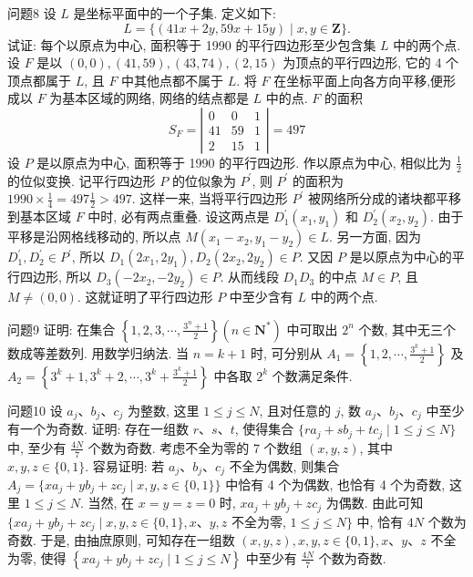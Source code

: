 问题8 设 $L$ 是坐标平面中的一个子集.
定义如下:
$$
L=\{(41 x+2 y, 59 x+15 y) \mid x, y \in \mathbf{Z}\} .
$$
试证: 每个以原点为中心, 面积等于 1990 的平行四边形至少包含集 $L$ 中的两个点.
设 $F$ 是以 $(0,0),(41,59),(43,74),(2,15)$ 为顶点的平行四边形, 它的 4 个顶点都属于 $L$, 且 $F$ 中其他点都不属于 $L$. 将 $F$ 在坐标平面上向各方向平移,便形成以 $F$ 为基本区域的网络, 网络的结点都是 $L$ 中的点.
$F$ 的面积
$$
S_F=\left|\begin{array}{ccc}
0 & 0 & 1 \\
41 & 59 & 1 \\
2 & 15 & 1
\end{array}\right|=497
$$
设 $P$ 是以原点为中心, 面积等于 1990 的平行四边形.
作以原点为中心, 相似比为 $\frac{1}{2}$ 的位似变换.
记平行四边形 $P$ 的位似象为 $P^{\prime}$, 则 $P^{\prime}$ 的面积为 $1990 \times \frac{1}{4}=497 \frac{1}{2}>497$. 这样一来, 当将平行四边形 $P^{\prime}$ 被网络所分成的诸块都平移到基本区域 $F$ 中时, 必有两点重叠.
设这两点是 $D_1^{\prime}\left(x_1, y_1\right)$ 和 $D_2^{\prime}\left(x_2, y_2\right)$. 由于平移是沿网格线移动的, 所以点 $M\left(x_1-x_2, y_1-y_2\right) \in L$.
另一方面, 因为 $D_1^{\prime}, D_2^{\prime} \in P^{\prime}$, 所以 $D_1\left(2 x_1, 2 y_1\right), D_2\left(2 x_2, 2 y_2\right) \in P$. 又因 $P$ 是以原点为中心的平行四边形, 所以 $D_3\left(-2 x_2,-2 y_2\right) \in P$. 从而线段 $D_1 D_3$ 的中点 $M \in P$, 且 $M \neq(0,0)$. 这就证明了平行四边形 $P$ 中至少含有 $L$ 中的两个点.



问题9 证明: 在集合 $\left\{1,2,3, \cdots, \frac{3^n+1}{2}\right\}\left(n \in \mathbf{N}^*\right)$ 中可取出 $2^n$ 个数, 其中无三个数成等差数列.
用数学归纳法.
当 $n=k+1$ 时, 可分别从 $A_1=\left\{1,2, \cdots, \frac{3^k+1}{2}\right\}$ 及 $A_2=\left\{3^k+1,3^k+2, \cdots, 3^k+\frac{3^k+1}{2}\right\}$ 中各取 $2^k$ 个数满足条件.



问题10 设 $a_j 、 b_j 、 c_j$ 为整数, 这里 $1 \leqslant j \leqslant N$, 且对任意的 $j$, 数 $a_j 、 b_j 、 c_j$ 中至少有一个为奇数.
证明: 存在一组数 $r 、 s 、 t$, 使得集合 $ \{r a_j+s b_j+t c_j \mid 1 \leqslant j \leqslant N\}$ 中, 至少有 $\frac{4 N}{7}$ 个数为奇数.
考虑不全为零的 7 个数组 $(x, y, z)$, 其中 $x, y, z \in\{0,1\}$. 容易证明: 若 $a_j 、 b_j 、 c_j$ 不全为偶数, 则集合 $A_j=\{x a_j+y b_j+z c_j \mid x, y, z \in\{0,1\}\}$ 中恰有 4 个为偶数, 也恰有 4 个为奇数, 这里 $1 \leqslant j \leqslant N$. 当然, 在 $x=y= z=0$ 时, $x a_j+y b_j+z c_j$ 为偶数.
由此可知 $ \{x a_j+y b_j+z c_j \mid x, y, z \in\{0,1\}, x 、 y, z$ 不全为零, $1 \leqslant j \leqslant N\}$ 中, 恰有 $4 N$ 个数为奇数.
于是, 由抽庶原则, 可知存在一组数 $(x, y, z), x, y, z \in\{0,1\}, x 、 y 、 z$ 不全为零, 使得 $\left\{x a_j+y b_j+z c_j \mid 1 \leqslant j \leqslant N\right\}$ 中至少有 $\frac{4 N}{7}$ 个数为奇数.



